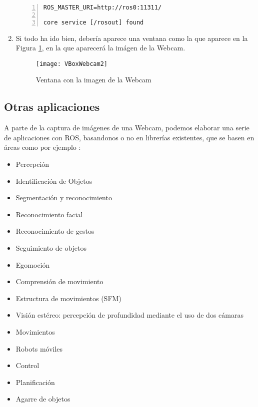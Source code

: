 \begin{enumerate}
\begin{lstlisting}[style=consola,numbers=left]
ROS_MASTER_URI=http://ros0:11311/

core service [/rosout] found
			\end{lstlisting}
			
			\item Si todo ha ido bien, debería aparece una ventana como la que aparece en la Figura \ref{fig:VBoxWebcam2}, en la que aparecerá la imágen de la Webcam.
			\begin{figure}[H]
				\centering
				\texttt{[image: VBoxWebcam2]}
				\caption{Ventana con la imagen de la Webcam}
				\label{fig:VBoxWebcam2}
			\end{figure}
			
		\end{enumerate}
		
		\subsection{Otras aplicaciones}
		A parte de la captura de imágenes de una Webcam, podemos elaborar una serie de aplicaciones con ROS, basandonos o no en librerías existentes, que se basen en áreas como por ejemplo \cite{ros-wikipedia}:
		\begin{itemize}
			\item Percepción
			\item Identificación de Objetos
			\item Segmentación y reconocimiento
			\item Reconocimiento facial
			\item Reconocimiento de gestos
			\item Seguimiento de objetos
			\item Egomoción
			\item Comprensión de movimiento
			\item Estructura de movimientos (SFM)
			\item Visión estéreo: percepción de profundidad mediante el uso de dos cámaras
			\item Movimientos
			\item Robots móviles
			\item Control
			\item Planificación
			\item Agarre de objetos
		\end{itemize}